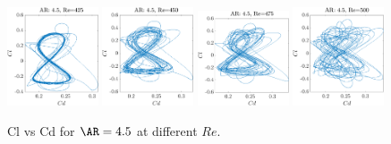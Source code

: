 \iffalse
\begin{figure}
  \centering
  \includegraphics[width=0.24\textwidth]{./fig/nnl/ClCdAR4.5RE425.png}
  \includegraphics[width=0.24\textwidth]{./fig/nnl/ClCdAR4.5RE450.png}
  \includegraphics[width=0.24\textwidth]{./fig/nnl/ClCdAR4.5RE475.png}
  \includegraphics[width=0.24\textwidth]{./fig/nnl/ClCdAR4.5RE500.png}
  \caption{Cl vs Cd for $\AR=4.5$ at different $Re$.}
  \label{fig:ClCd}
\end{figure}

